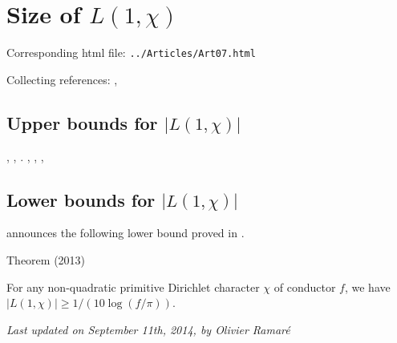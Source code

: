 \chapter{   Size of $L(1,\chi)$}

Corresponding html file: \texttt{../Articles/Art07.html}









Collecting references:
\cite{Louboutin*93},


\section{Upper bounds for $|L(1,\chi)|$}


\cite{Louboutin*96},
\cite{Granville-Soundararajan*02},
\cite{Granville-Soundararajan*04}.
\cite{Ramare*01},
\cite{Ramare*02-??},
\cite{Louboutin*98},

\section{Lower bounds for $|L(1,\chi)|$}

\cite{Louboutin*13}
announces the following lower bound proved in
\cite{Louboutin*15}
.

\begin{thm}{Theorem (2013)}

For any non-quadratic primitive Dirichlet character $\chi$ of conductor $f$,
we have $|L(1,\chi)|\ge 1/ ( 10\log(f/\pi))$.
\end{thm}





 
 








  
\begin{flushright}\small\sl{}   Last updated on September 11th, 2014, by Olivier Ramar\'e
 \end{flushright}















